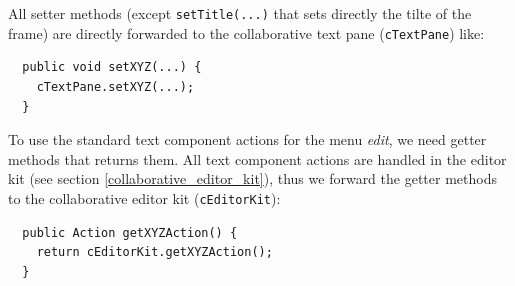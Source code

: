 All setter methods (except \texttt{setTitle(...)} that sets directly the tilte of the frame) are directly forwarded to the collaborative text pane (\texttt{cTextPane}) like:
\begin{verbatim}
  public void setXYZ(...) {
    cTextPane.setXYZ(...);
  }
\end{verbatim}

To use the standard text component actions for the menu \textit{edit}, we need getter methods that returns them. All text component actions are handled in the editor kit (see section \ref{collaborative_editor_kit}), thus we forward the getter methods to the collaborative editor kit (\texttt{cEditorKit}):
\begin{verbatim}
  public Action getXYZAction() {
    return cEditorKit.getXYZAction();
  }
\end{verbatim}


